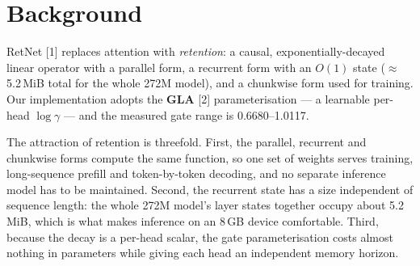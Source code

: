 %
%

\section{Background}
\label{sec:en-bg}

RetNet [1] replaces attention with \emph{retention}: a causal, exponentially-decayed linear
operator with a parallel form, a recurrent form with an $O(1)$ state
($\approx$ 5.2\,MiB total for the whole 272M model), and a chunkwise form used for
training. Our implementation adopts the \textbf{GLA} [2] parameterisation --- a learnable
per-head $\log\gamma$ --- and the measured gate range is 0.6680--1.0117.

The attraction of retention is threefold. First, the parallel, recurrent and chunkwise
forms compute the same function, so one set of weights serves training, long-sequence
prefill and token-by-token decoding, and no separate inference model has to be maintained.
Second, the recurrent state has a size independent of sequence length: the whole 272M
model's layer states together occupy about 5.2\,MiB, which is what makes inference on an
8\,GB device comfortable. Third, because the decay is a per-head scalar, the gate
parameterisation costs almost nothing in parameters while giving each head an independent
memory horizon.

